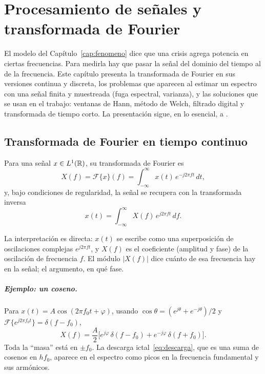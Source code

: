 \chapter{Procesamiento de señales y transformada de Fourier}
\label{cap:fourier}

El modelo del Capítulo~\ref{cap:fenomeno} dice que una crisis agrega potencia en ciertas frecuencias. Para
medirla hay que pasar la señal del dominio del tiempo al de la frecuencia. Este capítulo presenta la
transformada de Fourier en sus versiones continua y discreta, los problemas que aparecen al estimar
un espectro con una señal finita y muestreada (fuga espectral, varianza), y las soluciones que se usan
en el trabajo: ventanas de Hann, método de Welch, filtrado digital y transformada de tiempo corto. La
presentación sigue, en lo esencial, a \textcite{oppenheim2010}.

\section{Transformada de Fourier en tiempo continuo}

\begin{definicion}
Para una señal $x \in L^1(\mathbb{R})$, su transformada de Fourier es
\begin{equation}
  X(f) = \mathcal{F}\{x\}(f) = \int_{-\infty}^{\infty} x(t)\, e^{-j2\pi f t}\, dt,
  \label{eq:fourier}
\end{equation}
y, bajo condiciones de regularidad, la señal se recupera con la transformada inversa
\begin{equation}
  x(t) = \int_{-\infty}^{\infty} X(f)\, e^{j2\pi f t}\, df.
\end{equation}
\end{definicion}

La interpretación es directa: $x(t)$ se escribe como una superposición de oscilaciones complejas
$e^{j2\pi ft}$, y $X(f)$ es el coeficiente (amplitud y fase) de la oscilación de frecuencia $f$.
El módulo $|X(f)|$ dice cuánto de esa frecuencia hay en la señal; el argumento, en qué fase.

\paragraph{Ejemplo: un coseno.} Para $x(t) = A\cos(2\pi f_0 t + \varphi)$,
usando $\cos\theta = (e^{j\theta} + e^{-j\theta})/2$ y $\mathcal{F}\{e^{j2\pi f_0 t}\} = \delta(f - f_0)$,
\begin{equation}
  X(f) = \frac{A}{2}\Big[e^{j\varphi}\,\delta(f - f_0) + e^{-j\varphi}\,\delta(f + f_0)\Big].
\end{equation}
Toda la ``masa'' está en $\pm f_0$. La descarga ictal~\eqref{eq:descarga}, que es una suma de cosenos en
$h f_0$, aparece en el espectro como picos en la frecuencia fundamental y sus armónicos.

